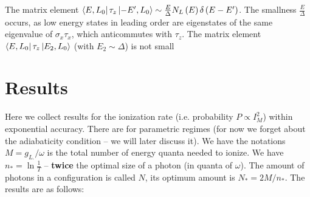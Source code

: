   The matrix element $ \bra{E,L_0}\tau_z\ket{-E', L_0} \sim\frac{E}{\Delta}
  N_L\left(E\right)\delta\left(E-E'\right)$. The smallness $ \frac{E}{\Delta} $ occurs, as low energy states in leading order are eigenstates  of the same eigenvalue of $ \sigma_x\tau_x $, which anticommutes with $ \tau_z $. The matrix element $ \bra{E,L_0}\tau_z\ket{E_2, L_0}$ (with $ E_2\sim \Delta $) is not small
\section{Results}

Here we collect results for the ionization rate (i.e. probability
$P\propto I_{M}^{2}$) within exponential accuracy. There are for
parametric regimes (for now we forget about the adiabaticity condition
-- we will later discuss it). We have the notations $M=g_{L.}/\omega$
is the total number of energy quanta needed to ionize. We have $n_{*}=\ln\frac{1}{T}$
-- \textbf{twice} the optimal size of a photon (in quanta of $\omega$).
The amount of photons in a configuration is called $N$, its optimum
amount is $N_{*}=2M/n_{*}$. The results are as follows:

